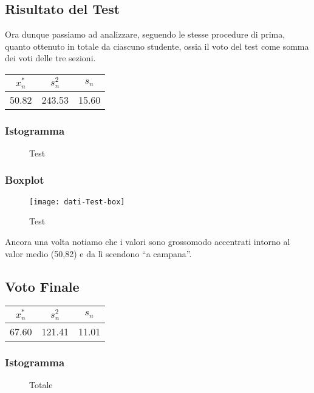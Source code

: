 \thispagestyle{empty} %
\subsection{Risultato del Test}
Ora dunque passiamo ad analizzare, seguendo le stesse procedure di prima, quanto ottenuto in totale da ciascuno studente, ossia il voto del test come somma dei voti delle tre sezioni.
\begin{center}
\begin{tabular}{|c|c|c|}
  \hline
  \(x_{n}^{*}\) & \(s_n^2\) & \(s_n\) \\
  \hline
  50.82 & 243.53 & 15.60 \\
  \hline
\end{tabular}
\end{center}

\subsubsection{Istogramma}
\begin{figure}[!h]
  \caption{Test}
\end{figure}

\subsubsection{Boxplot}
\begin{figure}[!h]
  \centering
  \texttt{[image: dati-Test-box]}
  \caption{Test}
\end{figure}
Ancora una volta notiamo che i valori sono grossomodo accentrati intorno al valor medio (50,82) e da lì scendono “a campana”.
\restoregeometry
\clearpage
\thispagestyle{empty} %
\subsection{Voto Finale}

\begin{center}
\begin{tabular}{|c|c|c|}
  \hline
  \(x_{n}^{*}\) & \(s_n^2\) & \(s_n\) \\
  \hline
 67.60 & 121.41 & 11.01 \\ 
  \hline
\end{tabular}
\end{center}

\subsubsection{Istogramma}
\begin{figure}[!h]
  \caption{Totale}
\end{figure}

